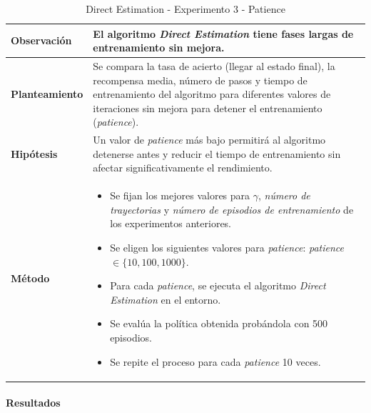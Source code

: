 \begin{table}[H]
    \centering
    \begin{tabularx}{\textwidth}{|p{4cm}|X|} %
        \hline %
        \textbf{Observación} & El algoritmo \textit{Direct Estimation} tiene fases largas de entrenamiento sin mejora.
        \\ \hline
        \textbf{Planteamiento} & Se compara la tasa de acierto (llegar al estado final), la recompensa media, número de pasos y tiempo de entrenamiento del algoritmo para diferentes valores de iteraciones sin mejora para detener el entrenamiento (\textit{patience}).
        \\ \hline
        \textbf{Hipótesis} & Un valor de \textit{patience} más bajo permitirá al algoritmo detenerse antes y reducir el tiempo de entrenamiento sin afectar significativamente el rendimiento.
        \\ \hline
        \textbf{Método} & 
        \begin{itemize}
            \item Se fijan los mejores valores para \(\gamma\), \textit{número de trayectorias} y \textit{número de episodios de entrenamiento} de los experimentos anteriores.
            \item Se eligen los siguientes valores para \textit{patience}: \textit{patience} \(\in \{10, 100, 1000\}\).
            \item Para cada \textit{patience}, se ejecuta el algoritmo \textit{Direct Estimation} en el entorno.
            \item Se evalúa la política obtenida probándola con 500 episodios.
            \item Se repite el proceso para cada \textit{patience} 10 veces.
        \end{itemize}
        \\ \hline
    \end{tabularx}
    \caption{Direct Estimation - Experimento 3 - Patience}
    \label{tab:diseñoDirectEstimationExp3}
\end{table}

\paragraph{Resultados}
